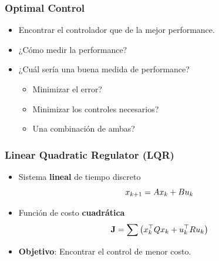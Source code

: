 \begin{frame}
    \frametitle{Optimal Control}
    
    \begin{itemize}
        \item Encontrar el controlador que de la mejor performance.
        \item ¿Cómo medir la performance?
        \item ¿Cuál sería una buena medida de performance?
        \begin{itemize}
            \item Minimizar el error?
            \item Minimizar los controles necesarios?
            \item Una combinación de ambas?
        \end{itemize}
    \end{itemize}
    
\end{frame}

\begin{frame}
    \frametitle{Linear Quadratic Regulator (LQR)}
    
    \begin{itemize}
        \item Sistema \textbf{lineal} de tiempo discreto
            \begin{equation*}
                x_{k+1} = A x_{k} + B u_{k}
            \end{equation*}
        \item Función de costo \textbf{cuadrática}
            \begin{equation*}
                \boldsymbol{\mathbf{J}} = \sum{\left(x_{k}^{\top} Q x_{k} + u_{k}^{\top} R u_{k}\right)}
            \end{equation*}
        \item \textbf{Objetivo}: Encontrar el control de menor costo.
    \end{itemize}
    
\end{frame}

